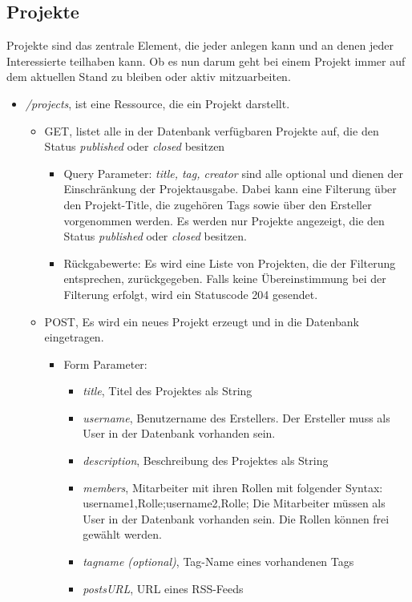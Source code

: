 \documentclass[12pt]{scrartcl}
\begin{document}
\subsection{Projekte}
	Projekte sind das zentrale Element, die jeder anlegen kann und an denen jeder Interessierte teilhaben kann. Ob es nun darum geht bei einem Projekt immer auf dem aktuellen Stand zu bleiben oder aktiv mitzuarbeiten.
	\begin{itemize}
			\item \emph{/projects}, ist eine Ressource, die ein Projekt darstellt. 
			\begin{itemize}
				\item GET, listet alle in der Datenbank verfügbaren Projekte auf, die den Status \emph{published} oder \emph{closed} besitzen
				\begin{itemize}
					\item Query Parameter: \emph{title, tag, creator} sind alle optional und dienen der Einschränkung der Projektausgabe. Dabei kann eine Filterung über den Projekt-Title, die zugehören Tags sowie über den Ersteller vorgenommen werden. Es werden nur Projekte angezeigt, die den Status \emph{published} oder \emph{closed} besitzen.
					\item Rückgabewerte: Es wird eine Liste von Projekten, die der Filterung entsprechen, zurückgegeben. Falls keine Übereinstimmung bei der Filterung erfolgt, wird ein Statuscode 204 gesendet. 
				\end{itemize}
				\item POST, Es wird ein neues Projekt erzeugt und in die Datenbank eingetragen.
				\begin{itemize}
					\item Form Parameter:
					\begin{itemize}
						\item  \emph{title}, Titel des Projektes als String
						\item  \emph{username}, Benutzername des Erstellers. Der Ersteller muss als User in der Datenbank vorhanden sein.
						\item  \emph{description}, Beschreibung des Projektes als String
						\item  \emph{members}, Mitarbeiter mit ihren Rollen mit folgender Syntax: username1,Rolle;username2,Rolle; Die Mitarbeiter müssen als User in der Datenbank vorhanden sein. Die Rollen können frei gewählt werden.
						\item  \emph{tagname (optional)}, Tag-Name eines vorhandenen Tags
						\item \emph{postsURL}, URL eines RSS-Feeds 

\end{itemize}
\end{itemize}
\end{itemize}
\end{itemize}
\end{document}
